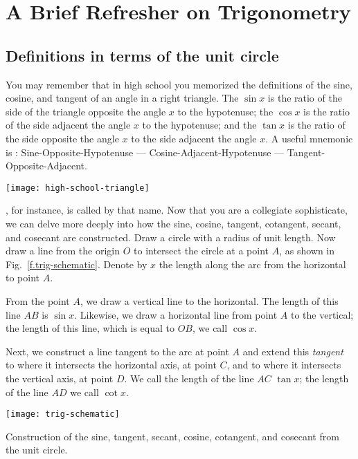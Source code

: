 \section{A Brief Refresher on Trigonometry}

\subsection{Definitions in terms of the unit circle}

You may remember that in high school you memorized the definitions of the sine, cosine, and tangent of an angle in a right triangle.  The $\sin x$ is the ratio of the side of the triangle opposite the angle $x$ to the hypotenuse; the $\cos x$ is the ratio of the side adjacent the angle $x$ to the hypotenuse; and the $\tan x$ is the ratio of the side opposite the angle $x$ to the side adjacent the angle $x$. A useful mnemonic is : Sine-Opposite-Hypotenuse --- Cosine-Adjacent-Hypotenuse --- Tangent-Opposite-Adjacent.

\begin{marginfigure}
\texttt{[image: high-school-triangle]}
\label{f.high-school-triangle}
\end{marginfigure}

, for instance, is called by that name.  Now that you are a  collegiate sophisticate, we can delve more deeply into how the sine, cosine, tangent, cotangent, secant, and cosecant are constructed.
Draw a circle with a radius of unit length.  Now draw a line from the origin $O$ to intersect the circle at a point $A$, as shown in Fig.~\ref{f.trig-schematic}.  Denote by $x$ the length along the arc from the horizontal to point $A$.

From the point $A$, we draw a vertical line to the horizontal.  The length of this line $AB$ is $\sin x$. Likewise, we draw a horizontal line from point $A$ to the vertical; the length of this line, which is equal to $OB$, we call $\cos x$.  

Next, we construct a line tangent to the arc at point $A$ and extend this \emph{tangent} to where it intersects the horizontal axis, at point $C$, and to where it intersects the vertical axis, at point $D$.  We call the length of the line $AC$ $\tan x$; the length of the line $AD$ we call $\cot x$.

\begin{marginfigure}[-6\baselineskip]
\texttt{[image: trig-schematic]}
\caption[Construction from the unit circle]{Construction of the sine, tangent, secant, cosine, cotangent, and cosecant from the unit circle.}
\label{f.trig-schematic}
\end{marginfigure}

